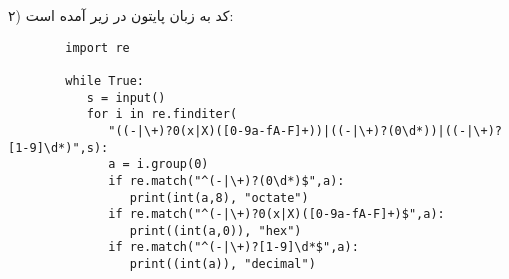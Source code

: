 ۲) کد به زبان پایتون در زیر آمده است:
\begin{latin}
	\begin{verbatim}
		import re   
		
		while True:
		   s = input()
		   for i in re.finditer(
		      "((-|\+)?0(x|X)([0-9a-fA-F]+))|((-|\+)?(0\d*))|((-|\+)?[1-9]\d*)",s):
		      a = i.group(0)
		      if re.match("^(-|\+)?(0\d*)$",a):
		         print(int(a,8), "octate")
		      if re.match("^(-|\+)?0(x|X)([0-9a-fA-F]+)$",a):
		         print((int(a,0)), "hex")
		      if re.match("^(-|\+)?[1-9]\d*$",a):
		         print((int(a)), "decimal")
	\end{verbatim}
\end{latin}